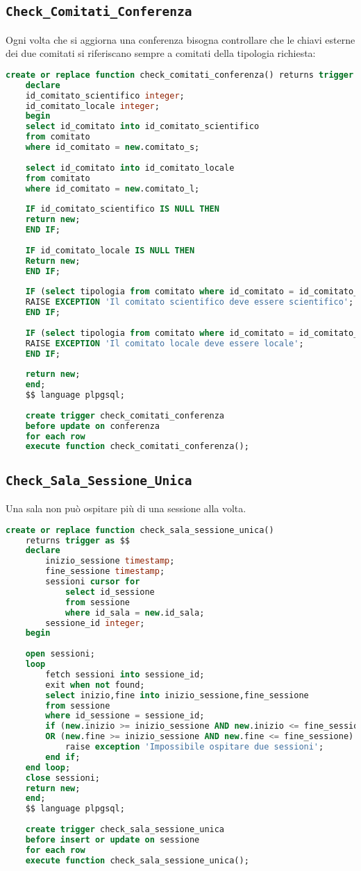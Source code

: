\subsection{\texttt{Check\_Comitati\_Conferenza}}
Ogni volta che si aggiorna una conferenza bisogna controllare che le chiavi esterne dei due comitati si riferiscano sempre a comitati della tipologia richiesta:
\begin{lstlisting}[language=SQL, caption={\texttt{check\_comitati\_conferenza}},style=mystyle]
	create or replace function check_comitati_conferenza() returns trigger as $$
	declare 
	id_comitato_scientifico integer;
	id_comitato_locale integer;
	begin
	select id_comitato into id_comitato_scientifico
	from comitato
	where id_comitato = new.comitato_s;
	
	select id_comitato into id_comitato_locale
	from comitato
	where id_comitato = new.comitato_l;
	
	IF id_comitato_scientifico IS NULL THEN
	return new;
	END IF;
	
	IF id_comitato_locale IS NULL THEN
	Return new;
	END IF;
	
	IF (select tipologia from comitato where id_comitato = id_comitato_scientifico) <> 'scientifico' THEN
	RAISE EXCEPTION 'Il comitato scientifico deve essere scientifico';
	END IF;
	
	IF (select tipologia from comitato where id_comitato = id_comitato_locale) <> 'locale' THEN
	RAISE EXCEPTION 'Il comitato locale deve essere locale';
	END IF;
	
	return new;
	end;
	$$ language plpgsql;
	
	create trigger check_comitati_conferenza
	before update on conferenza
	for each row
	execute function check_comitati_conferenza();
\end{lstlisting}
\subsection{\texttt{Check\_Sala\_Sessione\_Unica}}
Una sala non può ospitare più di una sessione alla volta.
\begin{lstlisting}[caption={\texttt{Check\_sala\_sessione\_unica}}, language=SQL, style=mystyle]
	create or replace function check_sala_sessione_unica() 
	returns trigger as $$
	declare
		inizio_sessione timestamp;
		fine_sessione timestamp;
		sessioni cursor for 
			select id_sessione 
			from sessione 
			where id_sala = new.id_sala;
		sessione_id integer;
	begin
	
	open sessioni;
	loop
		fetch sessioni into sessione_id;
		exit when not found;
		select inizio,fine into inizio_sessione,fine_sessione
		from sessione
		where id_sessione = sessione_id;
		if (new.inizio >= inizio_sessione AND new.inizio <= fine_sessione) 
		OR (new.fine >= inizio_sessione AND new.fine <= fine_sessione) then
			raise exception 'Impossibile ospitare due sessioni';
		end if;
	end loop;
	close sessioni;
	return new;
	end;
	$$ language plpgsql;
	
	create trigger check_sala_sessione_unica
	before insert or update on sessione
	for each row
	execute function check_sala_sessione_unica();
\end{lstlisting}
